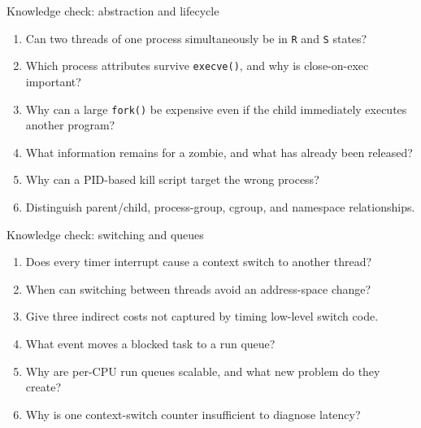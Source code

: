 \documentclass[aspectratio=169,11pt]{beamer}
\newcommand{\code}[1]{\texttt{#1}}
\begin{document}
\begin{frame}{Knowledge check: abstraction and lifecycle}
  \begin{enumerate}
    \item Can two threads of one process simultaneously be in \code{R} and \code{S} states?
    \item Which process attributes survive \code{execve()}, and why is close-on-exec important?
    \item Why can a large \code{fork()} be expensive even if the child immediately executes another program?
    \item What information remains for a zombie, and what has already been released?
    \item Why can a PID-based kill script target the wrong process?
    \item Distinguish parent/child, process-group, cgroup, and namespace relationships.
  \end{enumerate}
\end{frame}

\begin{frame}{Knowledge check: switching and queues}
  \begin{enumerate}
    \item Does every timer interrupt cause a context switch to another thread?
    \item When can switching between threads avoid an address-space change?
    \item Give three indirect costs not captured by timing low-level switch code.
    \item What event moves a blocked task to a run queue?
    \item Why are per-CPU run queues scalable, and what new problem do they create?
    \item Why is one context-switch counter insufficient to diagnose latency?
  \end{enumerate}
\end{frame}
\end{document}
